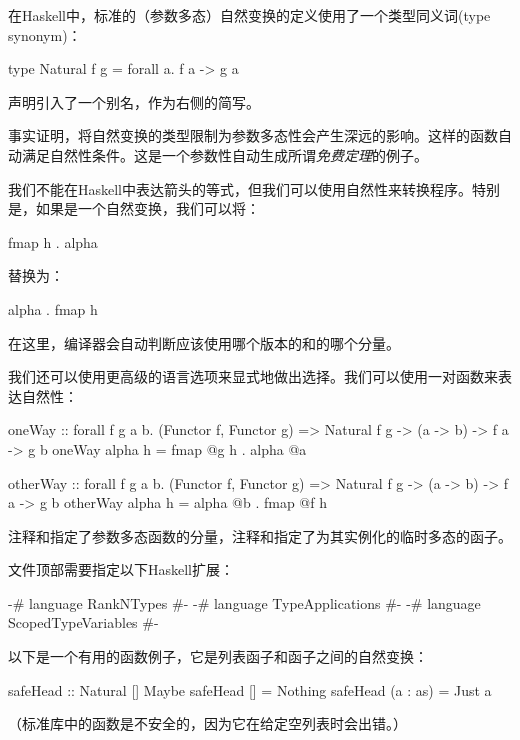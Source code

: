 \documentclass[DaoFP]{subfiles}
\begin{document}
    在Haskell中，标准的（参数多态）自然变换的定义使用了一个类型同义词(type synonym)：
    \begin{haskell}
        type Natural f g = forall a. f a -> g a
    \end{haskell}
    声明引入了一个别名，作为右侧的简写。

    事实证明，将自然变换的类型限制为参数多态性会产生深远的影响。这样的函数自动满足自然性条件。这是一个参数性自动生成所谓\emph{免费定理}的例子。

    我们不能在Haskell中表达箭头的等式，但我们可以使用自然性来转换程序。特别是，如果是一个自然变换，我们可以将：
    \begin{haskell}
        fmap h . alpha
    \end{haskell}
    替换为：
    \begin{haskell}
        alpha . fmap h
    \end{haskell}
    在这里，编译器会自动判断应该使用哪个版本的和的哪个分量。

    我们还可以使用更高级的语言选项来显式地做出选择。我们可以使用一对函数来表达自然性：
    \begin{haskell}
        oneWay ::
        forall f g a b. (Functor f, Functor g) =>
        Natural f g -> (a -> b) -> f a -> g b
        oneWay alpha h = fmap @g h . alpha @a
    \end{haskell}
    \begin{haskell}
        otherWay ::
        forall f g a b. (Functor f, Functor g) =>
        Natural f g -> (a -> b) -> f a -> g b
        otherWay alpha h = alpha @b . fmap @f h
    \end{haskell}
    注释和指定了参数多态函数的分量，注释和指定了为其实例化的临时多态的函子。

    文件顶部需要指定以下Haskell扩展：
    \begin{haskell}
    {-# language RankNTypes #-}
    {-# language TypeApplications #-}
    {-# language ScopedTypeVariables #-}
    \end{haskell}

    以下是一个有用的函数例子，它是列表函子和函子之间的自然变换：
    \begin{haskell}
        safeHead :: Natural [] Maybe
        safeHead [] = Nothing
        safeHead (a : as) = Just a
    \end{haskell}
    （标准库中的函数是不安全的，因为它在给定空列表时会出错。）
\end{document}
